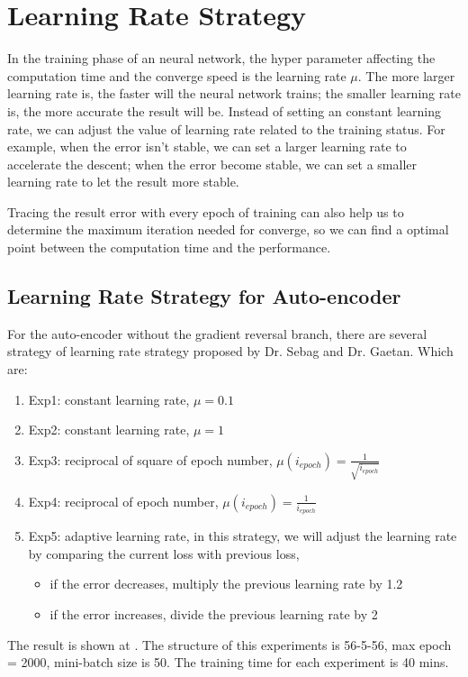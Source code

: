 \section{Learning Rate Strategy}
In the training phase of an neural network, the hyper parameter affecting the computation time and the converge speed is the learning rate $ \mu $. The more larger learning rate is, the faster will the neural network trains; the smaller learning rate is, the more accurate the result will be. Instead of setting an constant learning rate, we can adjust the value of learning rate related to the training status. For example, when the error isn't stable, we can set a larger learning rate to accelerate the descent; when the error become stable, we can set a smaller learning rate to let the result more stable.

Tracing the result error with every epoch of training can also help us to determine the maximum iteration needed for converge, so we can find a optimal point between the computation time and the performance.

\subsection{Learning Rate Strategy for Auto-encoder}
For the auto-encoder without the gradient reversal branch, there are several strategy of learning rate strategy proposed by Dr. Sebag and Dr. Gaetan. Which are:
\begin{enumerate}
	\item Exp1: constant learning rate, $ \mu = 0.1 $
	\item Exp2: constant learning rate, $ \mu = 1 $
	\item Exp3: reciprocal of square of epoch number, $ \mu(i_{epoch}) = \frac{1}{\sqrt{i_{epoch}}}$
	\item Exp4: reciprocal of epoch number,  $ \mu(i_{epoch}) = \frac{1}{i_{epoch}} $
	\item Exp5: adaptive learning rate, in this strategy, we will adjust the learning rate by comparing the current loss with previous loss,\begin{itemize}
		\item if the error decreases, multiply the previous learning rate by 1.2
		\item if the error increases, divide the previous learning rate by 2
	\end{itemize}
\end{enumerate}

The result is shown at . The structure of this experiments is 56-5-56, max epoch = 2000, mini-batch size is 50. The training time for each experiment is 40 mins.

